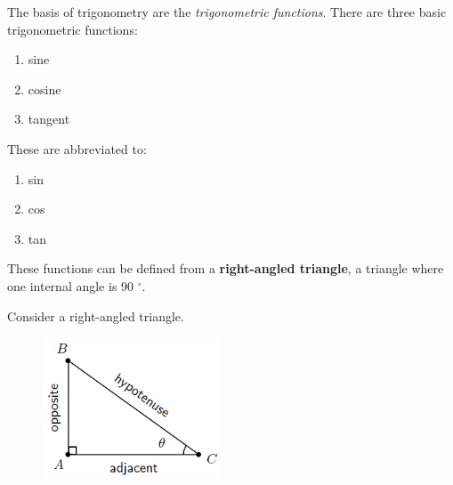       \label{m39408*id79540}The basis of trigonometry are the \textsl{trigonometric functions}. There are three basic trigonometric functions:\par 
      \label{m39408*id79552}\begin{enumerate}[noitemsep, label=\textbf{\arabic*}. ] 
            \label{m39408*uid15}\item sine
\label{m39408*uid16}\item cosine
\label{m39408*uid17}\item tangent
\end{enumerate}
      \label{m39408*id79593}These are abbreviated to:\par 
      \label{m39408*id79596}\begin{enumerate}[noitemsep, label=\textbf{\arabic*}. ] 
            \label{m39408*uid18}\item sin
\label{m39408*uid19}\item cos
\label{m39408*uid20}\item tan
\end{enumerate}
      \label{m39408*id79636}These functions can be defined from a \textbf{right-angled triangle}, a triangle where one internal angle is 90 \begin{math}{}^{\circ }\end{math}.\par 
      \label{m39408*id79660}Consider a right-angled triangle.\par 
      \label{m39408*id79664}
    \setcounter{subfigure}{0}
	\begin{figure}[H] %
    \begin{center}
    \label{m39408*id79667!!!underscore!!!media}\label{m39408*id79667!!!underscore!!!printimage}\includegraphics[width=200px]{col11306.imgs/m39408_MG10C15_003.png} %
      \vspace{2pt}
    \vspace{.1in}
    \end{center}
 \end{figure}       
